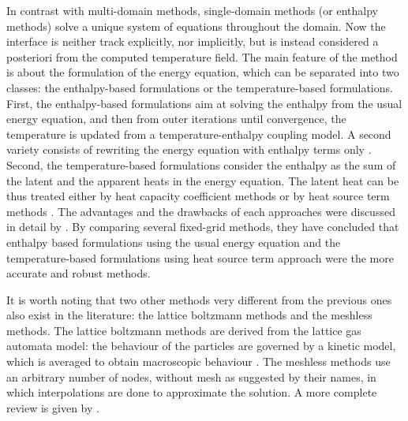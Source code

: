In contrast with multi-domain methods, single-domain methods (or enthalpy methods) solve a unique system of equations throughout the domain. 
Now the interface is neither track explicitly, nor implicitly, but is instead considered a posteriori from the computed temperature field.
The main feature of the method is about the formulation of the energy equation, which can be separated into two classes:
the enthalpy-based formulations or the temperature-based formulations.\\
First, the enthalpy-based formulations \citep{eyres1946calculation,rose1960method,bhattacharya2014enthalpy} aim at solving the enthalpy from the usual energy equation, and then from outer iterations until convergence, the temperature is updated from a temperature-enthalpy coupling model. 
A second variety consists of rewriting the energy equation with enthalpy terms only \citep{rady1996natural,hannoun2003resolving}.\\
Second, the temperature-based formulations consider the enthalpy as the sum of the latent and the apparent heats in the energy equation. 
The latent heat can be thus treated either by heat capacity coefficient methods \citep{gau1984melting,szekely1970effect,chiesa1974natural} or by heat source term methods \citep{Tenchev2005,swaminathan1997towards,dan-2014-JCP}.
The advantages and the drawbacks of each approaches were discussed in detail by \cite{konig2017comprehensive}.
By comparing several fixed-grid methods, they have concluded that enthalpy based formulations using the usual energy equation and the temperature-based formulations using heat source term approach were the more accurate and robust methods. 

It is worth noting that two other methods very different from the previous ones also exist in the literature:
the lattice boltzmann methods and the meshless methods.
The lattice boltzmann methods are derived from the lattice gas automata model: the behaviour of the particles are governed by a kinetic model, which is averaged to obtain macroscopic behaviour \citep{frisch1986lattice,luo2015lattice,gong2015numerical}.
The meshless methods use an arbitrary number of nodes, without mesh as suggested by their names, in which interpolations are done to approximate the solution. A more complete review is given by \cite{atluri2002meshless}.

